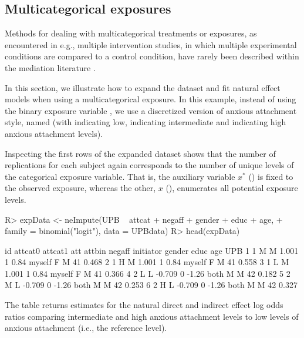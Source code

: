 \documentclass[nojss]{jss}
\begin{document}
\subsection{Multicategorical exposures}
Methods for dealing with multicategorical treatments or exposures, as encountered in e.g., multiple intervention studies, in which multiple experimental conditions are compared to a control condition, have rarely been described within the mediation literature \citep[although see][for some notable exceptions]{Hayes2014,R:mediation}.
\par In this section, we illustrate how to expand the dataset and fit natural effect models when using a multicategorical exposure. In this example, instead of using the binary exposure variable , we use a discretized version of anxious attachment style, named  (with  indicating low,  indicating intermediate and  indicating high anxious attachment levels). 
\par Inspecting the first rows of the expanded dataset shows that the number of replications for each subject again corresponds to the number of unique levels of the categorical exposure variable. That is, the auxiliary variable $x^*$ () is fixed to the observed exposure, whereas the other, $x$ (), enumerates all potential exposure levels.
\begin{Schunk}
\begin{Sinput}
R> expData <- neImpute(UPB ~ attcat + negaff + gender + educ + age,
+    family = binomial("logit"), data = UPBdata)
R> head(expData)
\end{Sinput}
\begin{Soutput}
  id attcat0 attcat1    att attbin negaff initiator gender educ age   UPB
1  1       M       M  1.001      1   0.84    myself      F    M  41 0.468
2  1       H       M  1.001      1   0.84    myself      F    M  41 0.558
3  1       L       M  1.001      1   0.84    myself      F    M  41 0.366
4  2       L       L -0.709      0  -1.26      both      M    M  42 0.182
5  2       M       L -0.709      0  -1.26      both      M    M  42 0.253
6  2       H       L -0.709      0  -1.26      both      M    M  42 0.327
\end{Soutput}
\end{Schunk}
The  table returns estimates for the natural direct and indirect effect log odds ratios comparing intermediate and high anxious attachment levels to low levels of anxious attachment (i.e., the reference level).
\end{document}
